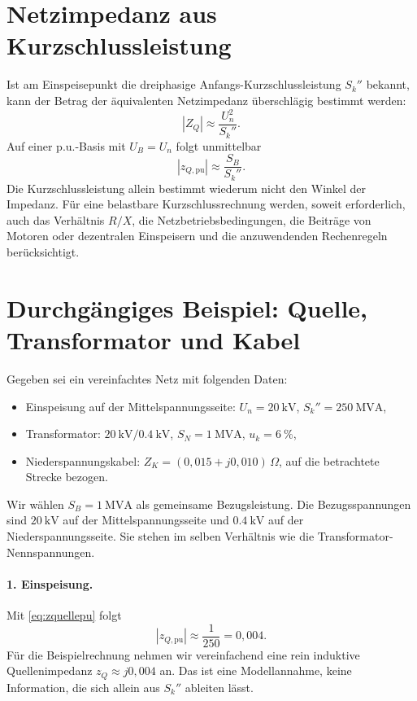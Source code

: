 \section{Netzimpedanz aus Kurzschlussleistung}

Ist am Einspeisepunkt die dreiphasige Anfangs-Kurzschlussleistung
$S_k''$ bekannt, kann der Betrag der äquivalenten Netzimpedanz überschlägig
bestimmt werden:
\begin{equation}
 |Z_Q|\approx\frac{U_n^2}{S_k''}.
 \label{eq:zquelle}
\end{equation}
Auf einer p.u.-Basis mit $U_B=U_n$ folgt unmittelbar
\begin{equation}
 |z_{Q,\mathrm{pu}}|\approx\frac{S_B}{S_k''}.
 \label{eq:zquellepu}
\end{equation}
Die Kurzschlussleistung allein bestimmt wiederum nicht den Winkel der
Impedanz. Für eine belastbare Kurzschlussrechnung werden, soweit erforderlich,
auch das Verhältnis $R/X$, die Netzbetriebsbedingungen, die Beiträge von
Motoren oder dezentralen Einspeisern und die anzuwendenden Rechenregeln
berücksichtigt.

\section{Durchgängiges Beispiel: Quelle, Transformator und Kabel}

Gegeben sei ein vereinfachtes Netz mit folgenden Daten:
\begin{itemize}
 \item Einspeisung auf der Mittelspannungsseite: $U_n=\SI{20}{\kilo\volt}$,
       $S_k''=\SI{250}{\mega\volt\ampere}$,
 \item Transformator: $\SI{20}{\kilo\volt}/\SI{0.4}{\kilo\volt}$,
       $S_N=\SI{1}{\mega\volt\ampere}$, $u_k=\SI{6}{\percent}$,
 \item Niederspannungskabel: $Z_K=(0{,}015+j0{,}010)\,\Omega$,
       auf die betrachtete Strecke bezogen.
\end{itemize}

Wir wählen $S_B=\SI{1}{\mega\volt\ampere}$ als gemeinsame
Bezugsleistung. Die Bezugsspannungen sind $\SI{20}{\kilo\volt}$ auf der
Mittelspannungsseite und $\SI{0.4}{\kilo\volt}$ auf der
Niederspannungsseite. Sie stehen im selben Verhältnis wie die
Transformator-Nennspannungen.

\paragraph{1. Einspeisung.}
Mit \cref{eq:zquellepu} folgt
\[
 |z_{Q,\mathrm{pu}}|\approx\frac{1}{250}=0{,}004.
\]
Für die Beispielrechnung nehmen wir vereinfachend eine rein induktive
Quellenimpedanz $z_Q\approx j0{,}004$ an. Das ist eine Modellannahme, keine
Information, die sich allein aus $S_k''$ ableiten lässt.

